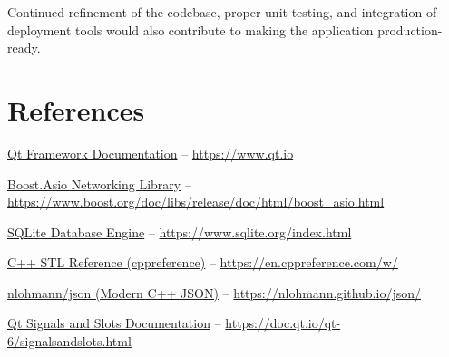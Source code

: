 \documentclass[12pt,a4paper]{article}
\begin{document}
Continued refinement of the codebase, proper unit testing, and integration of deployment tools would also contribute to making the application production-ready.

\section{References}

\begin{enumerate}[label={[R\arabic*]}]
  \item \href{https://www.qt.io}{Qt Framework Documentation} – \url{https://www.qt.io}
  \item \href{https://www.boost.org/doc/libs/release/doc/html/boost_asio.html}{Boost.Asio Networking Library} – \url{https://www.boost.org/doc/libs/release/doc/html/boost_asio.html}
  \item \href{https://www.sqlite.org/index.html}{SQLite Database Engine} – \url{https://www.sqlite.org/index.html}
  \item \href{https://en.cppreference.com/w/}{C++ STL Reference (cppreference)} – \url{https://en.cppreference.com/w/}
  \item \href{https://nlohmann.github.io/json/}{nlohmann/json (Modern C++ JSON)} – \url{https://nlohmann.github.io/json/}
  \item \href{https://doc.qt.io/qt-6/signalsandslots.html}{Qt Signals and Slots Documentation} – \url{https://doc.qt.io/qt-6/signalsandslots.html}
\end{enumerate}
\end{document}
